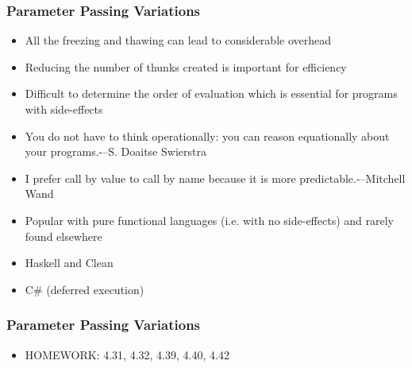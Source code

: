 \documentclass{beamer}
\begin{document}
\begin{frame}[fragile]
\frametitle{Parameter Passing Variations}
\begin{scriptsize}
\begin{itemize}
\item<1-> All the freezing and thawing can lead to considerable overhead

\item<1-> Reducing the number of thunks created is important for efficiency

\item<2-> Difficult to determine the order of evaluation which is essential for programs with side-effects

\item<3-> You do not have to think operationally: you can reason equationally about your programs.-–S. Doaitse Swierstra
\item<3-> I prefer call by value to call by name because it is more predictable.-–Mitchell Wand

\item<4-> Popular with pure functional languages (i.e. with no side-effects) and rarely found elsewhere

\item<4-> Haskell and Clean	
		
\item<4-> C\# (deferred execution)

\end{itemize}
\end{scriptsize}
\end{frame}

\begin{frame}[fragile]
\frametitle{Parameter Passing Variations}
\begin{scriptsize}
\begin{itemize}
\item<1-> HOMEWORK: 4.31, 4.32, 4.39, 4.40, 4.42

\end{itemize}
\end{scriptsize}
\end{frame}
\end{document}
